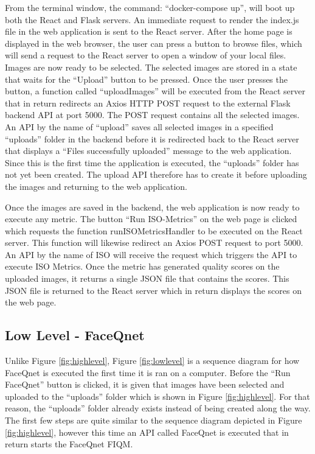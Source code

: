 \raggedbottom

From the terminal window, the command: ``docker-compose up'', will boot up both the React and Flask servers. An immediate request to render the index.js file in the web application is sent to the React server. After the home page is displayed in the web browser, the user can press a button to browse files, which will send a request to the React server to open a window of your local files. Images are now ready to be selected. The selected images are stored in a state that waits for the ``Upload'' button to be pressed. Once the user presses the button, a function called ``uploadImages'' will be executed from the React server that in return redirects an Axios HTTP POST request to the external Flask backend API at port 5000. The POST request contains all the selected images. An API by the name of ``upload'' saves all selected images in a specified ``uploads'' folder in the backend before it is redirected back to the React server that displays a ``Files successfully uploaded'' message to the web application. Since this is the first time the application is executed, the ``uploads'' folder has not yet been created. The upload API therefore has to create it before uploading the images and returning to the web application. 




Once the images are saved in the backend, the web application is now ready to execute any metric. The button ``Run ISO-Metrics'' on the web page is clicked which requests the function runISOMetricsHandler to be executed on the React server. This function will likewise redirect an Axios POST request to port 5000. An API by the name of ISO will receive the request which triggers the API to execute ISO Metrics. Once the metric has generated quality scores on the uploaded images, it returns a single JSON file that contains the scores. This JSON file is returned to the React server which in return displays the scores on the web page. 

\subsection{Low Level - FaceQnet}
Unlike Figure \ref{fig:highlevel}, Figure \ref{fig:lowlevel} is a sequence diagram for how FaceQnet is executed the first time it is ran on a computer. Before the ``Run FaceQnet'' button is clicked, it is given that images have been selected and uploaded to the ``uploads'' folder which is shown in Figure \ref{fig:highlevel}. For that reason, the ``uploads'' folder already exists instead of being created along the way. The first few steps are quite similar to the sequence diagram depicted in Figure \ref{fig:highlevel}, however this time an API called FaceQnet is executed that in return starts the FaceQnet FIQM. 

